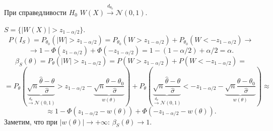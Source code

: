 \documentclass[12pt]{report}
\theoremstyle{definition}
\begin{document}
При справедливости $H_0$ $W(X) \xrightarrow{d_{\theta_0}} \mathcal{N}(0, 1)$.

$S = \{|W(X)| > z_{1 - \alpha/2}\}$.
$$P(I_S) = P_{\theta_0}(|W| > z_{1-\alpha/2}) = P_{\theta_0}(W > z_{1-\alpha/2}) + P_{\theta_0}(W < - z_{1-\alpha/2}) \rightarrow$$
$$\rightarrow 1 - \Phi(z_{1-\alpha/2}) + \Phi(-z_{1-\alpha/2}) = 1 - (1-\alpha/2) + \alpha/2 = \alpha.$$
$$\beta_S(\theta) = P_\theta(|W| > z_{1-\alpha/2}) = P(W > z_{1-\alpha/2}) + P(W < -z_{1-\alpha/2}) =$$
$$=P_\theta\left(\underbrace{\sqrt{n}\dfrac{\hat{\theta} - \theta}{\hat{\sigma}}}_{\xrightarrow{d_\theta} \mathcal{N}(0, 1)} > z_{1-\alpha/2} - \underbrace{\sqrt{n}\dfrac{\theta - \theta_0}{\hat{\sigma}}}_{w(\theta)}\right) + P_\theta\left(\underbrace{\sqrt{n}\dfrac{\hat{\theta} - \theta}{\hat{\sigma}}}_{\xrightarrow{d_\theta} \mathcal{N}(0, 1)} < - z_{1-\alpha/2} - \underbrace{\sqrt{n}\dfrac{\theta - \theta_0}{\hat{\sigma}}}_{w(\theta)}\right) \approx$$
$$\approx 1 - \Phi(z_{1-\alpha/2} - w(\theta)) + \Phi(-z_{1-\alpha/2} - w(\theta)).$$
Заметим, что при $|w(\theta)| \rightarrow +\infty$: $\beta_S(\theta) \rightarrow 1$.
\end{document}
